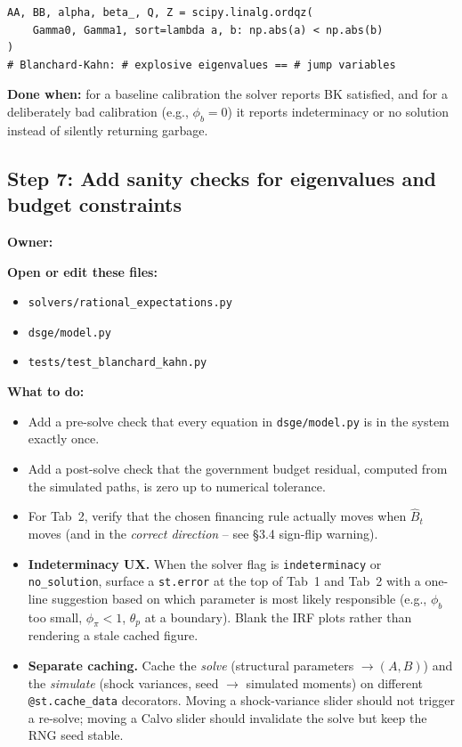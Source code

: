 \documentclass[11pt]{article}
\newcommand{\nameblank}{\underline{\hspace{4.5cm}}}
\begin{document}
\begin{lstlisting}
AA, BB, alpha, beta_, Q, Z = scipy.linalg.ordqz(
    Gamma0, Gamma1, sort=lambda a, b: np.abs(a) < np.abs(b)
)
# Blanchard-Kahn: # explosive eigenvalues == # jump variables
\end{lstlisting}

\textbf{Done when:} for a baseline calibration the solver reports BK satisfied, and for a deliberately bad calibration (e.g., $\phi_b=0$) it reports indeterminacy or no solution instead of silently returning garbage.

\subsection{Step 7: Add sanity checks for eigenvalues and budget constraints}
\textbf{Owner:} \nameblank

\textbf{Open or edit these files:}
\begin{itemize}
    \item \texttt{solvers/rational\_expectations.py}
    \item \texttt{dsge/model.py}
    \item \texttt{tests/test\_blanchard\_kahn.py}
\end{itemize}

\textbf{What to do:}
\begin{itemize}
    \item Add a pre-solve check that every equation in \texttt{dsge/model.py} is in the system exactly once.
    \item Add a post-solve check that the government budget residual, computed from the simulated paths, is zero up to numerical tolerance.
    \item For Tab~2, verify that the chosen financing rule actually moves when $\hat{B}_t$ moves (and in the \emph{correct direction} -- see \S3.4 sign-flip warning).
    \item \textbf{Indeterminacy UX.} When the solver flag is \texttt{indeterminacy} or \texttt{no\_solution}, surface a \texttt{st.error} at the top of Tab~1 and Tab~2 with a one-line suggestion based on which parameter is most likely responsible (e.g., $\phi_b$ too small, $\phi_\pi < 1$, $\theta_p$ at a boundary). Blank the IRF plots rather than rendering a stale cached figure.
    \item \textbf{Separate caching.} Cache the \emph{solve} (structural parameters $\to (A,B)$) and the \emph{simulate} (shock variances, seed $\to$ simulated moments) on different \texttt{@st.cache\_data} decorators. Moving a shock-variance slider should not trigger a re-solve; moving a Calvo slider should invalidate the solve but keep the RNG seed stable.
\end{itemize}
\end{document}
